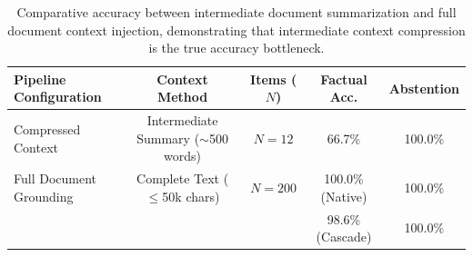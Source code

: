 \begin{table}[t]
\centering
\small
\caption{Comparative accuracy between intermediate document summarization and full document context injection, demonstrating that intermediate context compression is the true accuracy bottleneck.}
\label{tab:ablation}
\begin{tabular}{lcccc}
\toprule
\textbf{Pipeline Configuration} & \textbf{Context Method} & \textbf{Items ($N$)} & \textbf{Factual Acc.} & \textbf{Abstention} \\
\midrule
Compressed Context & Intermediate Summary ($\sim$500 words) & $N=12$ & 66.7\% & 100.0\% \\
Full Document Grounding & Complete Text ($\le$50k chars) & $N=200$ & 100.0\% (Native) & 100.0\% \\
 & & & 98.6\% (Cascade) & 100.0\% \\
\bottomrule
\end{tabular}
\end{table}
